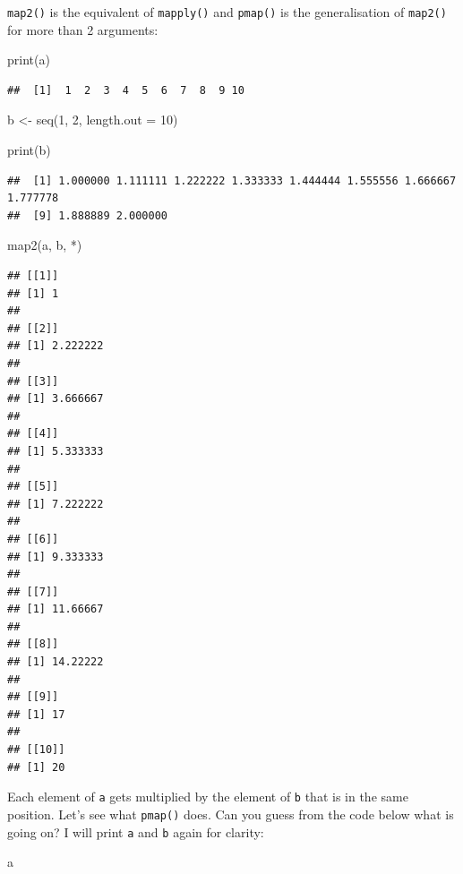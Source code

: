 \documentclass[
]{article}
\newenvironment{Shaded}{\begin{snugshade}}{\end{snugshade}}
\newcommand{\AttributeTok}[1]{\textcolor[rgb]{0.77,0.63,0.00}{#1}}
\newcommand{\DecValTok}[1]{\textcolor[rgb]{0.00,0.00,0.81}{#1}}
\newcommand{\FunctionTok}[1]{\textcolor[rgb]{0.00,0.00,0.00}{#1}}
\newcommand{\NormalTok}[1]{#1}
\newcommand{\OtherTok}[1]{\textcolor[rgb]{0.56,0.35,0.01}{#1}}
\newcommand{\StringTok}[1]{\textcolor[rgb]{0.31,0.60,0.02}{#1}}
\begin{document}
\texttt{map2()} is the equivalent of \texttt{mapply()} and \texttt{pmap()} is the generalisation of \texttt{map2()} for more
than 2 arguments:

\begin{Shaded}
\begin{Highlighting}[]
\FunctionTok{print}\NormalTok{(a)}
\end{Highlighting}
\end{Shaded}

\begin{verbatim}
##  [1]  1  2  3  4  5  6  7  8  9 10
\end{verbatim}

\begin{Shaded}
\begin{Highlighting}[]
\NormalTok{b }\OtherTok{\textless{}{-}} \FunctionTok{seq}\NormalTok{(}\DecValTok{1}\NormalTok{, }\DecValTok{2}\NormalTok{, }\AttributeTok{length.out =} \DecValTok{10}\NormalTok{)}

\FunctionTok{print}\NormalTok{(b)}
\end{Highlighting}
\end{Shaded}

\begin{verbatim}
##  [1] 1.000000 1.111111 1.222222 1.333333 1.444444 1.555556 1.666667 1.777778
##  [9] 1.888889 2.000000
\end{verbatim}

\begin{Shaded}
\begin{Highlighting}[]
\FunctionTok{map2}\NormalTok{(a, b, }\StringTok{\textasciigrave{}}\AttributeTok{*}\StringTok{\textasciigrave{}}\NormalTok{)}
\end{Highlighting}
\end{Shaded}

\begin{verbatim}
## [[1]]
## [1] 1
## 
## [[2]]
## [1] 2.222222
## 
## [[3]]
## [1] 3.666667
## 
## [[4]]
## [1] 5.333333
## 
## [[5]]
## [1] 7.222222
## 
## [[6]]
## [1] 9.333333
## 
## [[7]]
## [1] 11.66667
## 
## [[8]]
## [1] 14.22222
## 
## [[9]]
## [1] 17
## 
## [[10]]
## [1] 20
\end{verbatim}

Each element of \texttt{a} gets multiplied by the element of \texttt{b} that is in the same position.
Let's see what \texttt{pmap()} does. Can you guess from the code below what is going on? I will print
\texttt{a} and \texttt{b} again for clarity:

\begin{Shaded}
\begin{Highlighting}[]
\NormalTok{a}
\end{Highlighting}
\end{Shaded}
\end{document}
